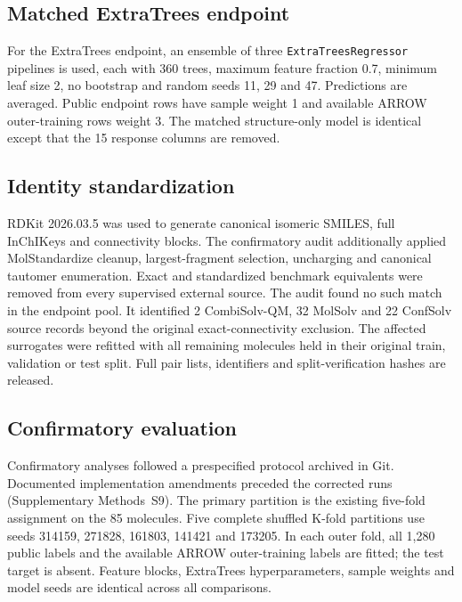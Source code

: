 \documentclass[12pt]{article}
\begin{document}
\subsection*{Matched ExtraTrees endpoint}

For the ExtraTrees endpoint, an ensemble of three \texttt{ExtraTreesRegressor} pipelines\cite{extratrees2006} is used, each
with 360 trees, maximum feature fraction 0.7, minimum leaf size 2, no bootstrap and
random seeds 11, 29 and 47. Predictions are averaged. Public endpoint rows have
sample weight 1 and available ARROW outer-training rows weight 3. The matched
structure-only model is identical except that the 15 response columns are removed.

\subsection*{Identity standardization}

RDKit 2026.03.5 was used to generate canonical isomeric SMILES, full InChIKeys and
connectivity blocks.\cite{rdkit2026} The confirmatory audit additionally applied
MolStandardize cleanup, largest-fragment selection, uncharging and canonical tautomer
enumeration. Exact and standardized benchmark equivalents were removed from every
supervised external source. The audit found no such match in the endpoint pool. It
identified 2 CombiSolv-QM, 32 MolSolv and 22 ConfSolv source records beyond the
original exact-connectivity exclusion. The affected surrogates were refitted with all
remaining molecules held in their original train, validation or test split. Full pair
lists, identifiers and split-verification hashes are released.

\subsection*{Confirmatory evaluation}

Confirmatory analyses followed a prespecified protocol archived in Git. Documented
implementation amendments preceded the corrected runs (Supplementary Methods~S9). The
primary partition is the existing five-fold assignment on the 85 molecules. Five
complete shuffled K-fold partitions use seeds 314159, 271828, 161803, 141421 and
173205. In each outer fold, all 1,280 public labels and the available ARROW
outer-training labels are fitted; the test target is absent. Feature blocks,
ExtraTrees hyperparameters, sample weights and model seeds are identical across all
comparisons.
\end{document}
